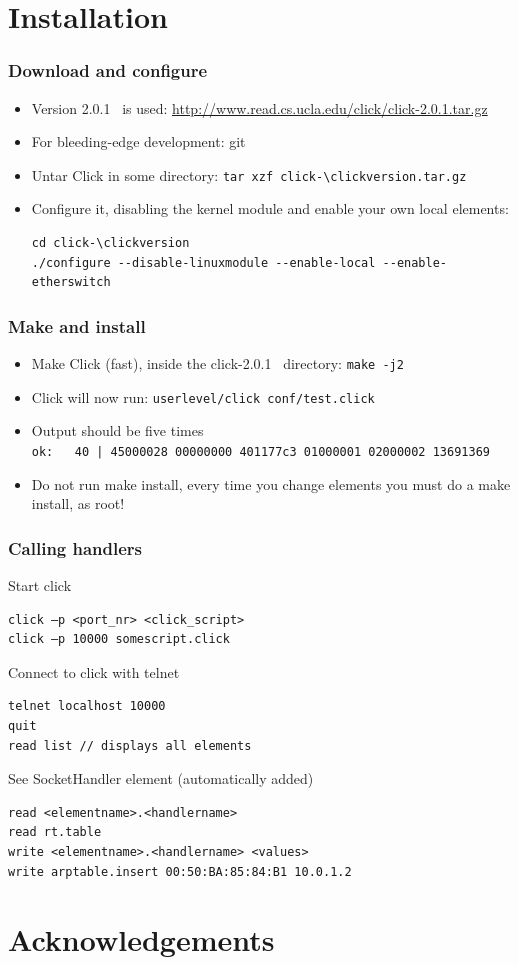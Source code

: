 \documentclass{beamer}
\newcommand{\clickversion}{2.0.1}
\begin{document}
\section{Installation}
\begin{frame}[fragile]
\frametitle{Download and configure}
\begin{itemize}
	\item Version \clickversion~ is used: \url{http://www.read.cs.ucla.edu/click/click-\clickversion.tar.gz }
	\item For bleeding-edge development: git
	\item Untar Click in some directory: \lstinline!tar xzf click-\clickversion.tar.gz!
	\item Configure it, disabling the kernel module and enable your own local elements:
	\begin{lstlisting}
cd click-\clickversion
./configure --disable-linuxmodule --enable-local --enable-etherswitch
\end{lstlisting}
\end{itemize}

\end{frame}
\begin{frame}[fragile]
	\frametitle{Make and install}
\begin{itemize}
	\item Make Click (fast), inside the click-\clickversion~ directory: \lstinline!make -j2!
	\item Click will now run: \lstinline!userlevel/click conf/test.click!
	\item Output should be five times \\ \lstinline!ok:   40 | 45000028 00000000 401177c3 01000001 02000002 13691369!
	\item Do not run make install, every time you change elements you must do a make install, as root!
\end{itemize}	
\end{frame}

\begin{frame}[fragile]
	\frametitle{Calling handlers}
Start click
\begin{verbatim}
click –p <port_nr> <click_script>
click –p 10000 somescript.click
\end{verbatim}
Connect to click with telnet
\begin{verbatim}
telnet localhost 10000
quit
read list // displays all elements
\end{verbatim}
See SocketHandler element (automatically added)
\begin{verbatim}
read <elementname>.<handlername>
read rt.table
write <elementname>.<handlername> <values>
write arptable.insert 00:50:BA:85:84:B1 10.0.1.2
\end{verbatim}
\end{frame}

\section*{Acknowledgements}
\end{document}
